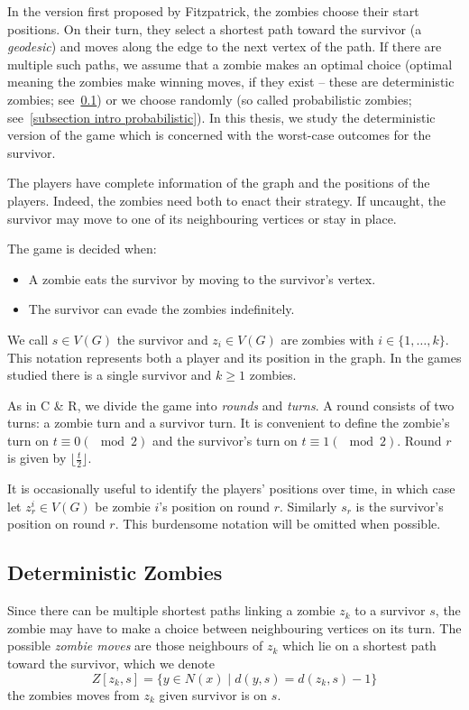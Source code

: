 In the version first proposed by Fitzpatrick, the zombies choose their start positions. On their turn, they select a shortest path toward the survivor (a \textit{geodesic}) and moves along the edge to the next vertex of the path. If there are multiple such paths, we assume that a zombie makes an optimal choice (optimal meaning the zombies make winning moves, if they exist -- these are deterministic zombies; see~\ref{subsection intro deterministic}) or we choose randomly (so called probabilistic zombies; see~\ref{subsection intro probabilistic}). In this thesis, we study the deterministic version of the game which is concerned with the worst-case outcomes for the survivor.

The players have complete information of the graph and the positions of the players. Indeed, the zombies need both to enact their strategy. If uncaught, the survivor may move to one of its neighbouring vertices or stay in place.

The game is decided when:
\begin{itemize}
\item A zombie eats the survivor by moving to the survivor's vertex.
\item The survivor can evade the zombies indefinitely.
\end{itemize}

We call $s \in V(G)$ the survivor and $z_i \in V(G)$ are zombies with $i \in \{1, \dots, k\}$.
This notation represents both a player and its position in the graph.
In the games studied there is a single survivor and $k \geq 1$ zombies.

As in C \& R, we divide the game into \textit{rounds} and \textit{turns}. A round consists of two turns: a zombie turn and a survivor turn.
It is convenient to define the zombie's turn on $t \equiv 0 (\mod{2})$ and the survivor's turn on $t \equiv 1 (\mod{2})$.
Round $r$ is given by $\lfloor \frac{t}{2} \rfloor$.

It is occasionally useful to identify the players' positions over time, in which
case let $z_r^i \in V(G)$ be zombie $i$'s position on round $r$. Similarly $s_r$ is the
survivor's position on round $r$. This burdensome notation will be omitted when possible.

\subsection{Deterministic Zombies}\label{subsection intro deterministic}

Since there can be multiple shortest paths linking a zombie $z_k$ to a survivor $s$, the zombie may have to make a choice between neighbouring vertices on its turn. The possible \textit{zombie moves}
are those neighbours of $z_k$ which lie on a shortest path toward the survivor, which we denote
\[ Z[z_k, s] = \{ y \in N(x) \mid d(y, s) = d(z_k, s) - 1 \} \]
the zombies moves from $z_k$ given survivor is on $s$.


